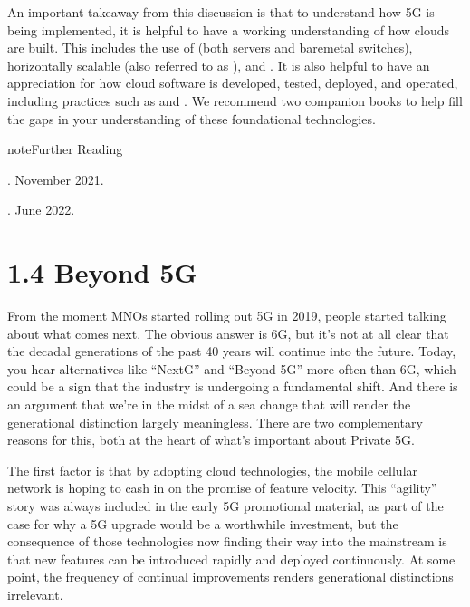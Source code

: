 \documentclass[a4paper,11pt,english]{sphinxmanual}
\begin{document}
\sphinxAtStartPar
An important takeaway from this discussion is that to understand how 5G
is being implemented, it is helpful to have a working understanding of
how clouds are built. This includes the use of 
(both servers and bare\sphinxhyphen{}metal switches), horizontally scalable
 (also referred to as ), and
. It is also helpful to have an
appreciation for how cloud software is developed, tested, deployed, and
operated, including practices such as  and . We recommend two companion books to
help fill the gaps in your understanding of these foundational
technologies.

\label{\detokenize{intro:reading-devops}}
\begin{sphinxadmonition}{note}{Further Reading}

\sphinxAtStartPar
{}. November 2021.

\sphinxAtStartPar
{}. June 2022.
\end{sphinxadmonition}


\section{1.4 Beyond 5G}
\label{\detokenize{intro:beyond-5g}}
\sphinxAtStartPar
From the moment MNOs started rolling out 5G in 2019, people started
talking about what comes next. The obvious answer is 6G, but it’s not
at all clear that the decadal generations of the past 40 years will
continue into the future. Today, you hear alternatives like
“NextG” and “Beyond 5G” more often than 6G, which could be a sign that
the industry is undergoing a fundamental shift. And there is an
argument that we’re in the midst of a sea change that will render the
generational distinction largely meaningless. There are two
complementary reasons for this, both at the heart of what’s important
about Private 5G.

\sphinxAtStartPar
The first factor is that by adopting cloud technologies, the mobile
cellular network is hoping to cash in on the promise of feature
velocity. This “agility” story was always included in the early 5G
promotional material, as part of the case for why a 5G upgrade would
be a worthwhile investment, but the consequence of those technologies
now finding their way into the mainstream is that new features can be
introduced rapidly and deployed continuously. At some point, the
frequency of continual improvements renders generational distinctions
irrelevant.
\end{document}
